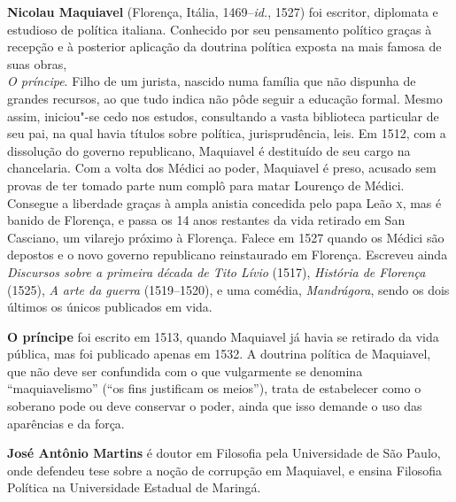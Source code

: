 \textbf{Nicolau Maquiavel} (Florença, Itália, 1469--\textit{id.}, 1527) foi escritor, diplomata e estudioso de política italiana. Conhecido por seu pensamento político graças à recepção e à posterior aplicação da doutrina política exposta na mais famosa de suas obras,\\ \textit{O príncipe}. Filho de um jurista, nascido numa família que não dispunha de grandes recursos, ao que tudo indica não pôde seguir a educação formal. Mesmo assim, iniciou"-se cedo nos estudos, consultando a vasta biblioteca particular de seu pai, na qual havia títulos sobre política, jurisprudência, leis. Em 1512, com a dissolução do governo republicano, Maquiavel é destituído de seu cargo na chancelaria. Com a volta dos Médici ao poder, Maquiavel é preso, acusado sem provas de ter tomado parte num complô para matar Lourenço de Médici. Consegue a liberdade graças à ampla anistia concedida pelo papa Leão \textsc{x}, mas é banido de Florença, e passa os 14 anos restantes da vida retirado em San Casciano, um vilarejo próximo à Florença. Falece em 1527 quando os Médici são depostos e o novo governo republicano reinstaurado em Florença. Escreveu ainda \textit{Discursos sobre a primeira década de Tito Lívio} (1517), \textit{História de Florença} (1525), \textit{A arte da guerra} (1519--1520), e uma comédia, \textit{Mandrágora}, sendo os dois últimos os únicos publicados em vida. 

\textbf{O príncipe} foi escrito em 1513, quando Maquiavel já havia se retirado da vida pública, mas foi publicado apenas em 1532. A doutrina política de Maquiavel, que não deve ser confundida com o que vulgarmente se denomina “maquiavelismo” (“os fins justificam os meios”), trata de estabelecer como o soberano pode ou deve conservar o poder, ainda que isso demande o uso das aparências e da força. 

\textbf{José Antônio Martins} é doutor em Filosofia pela Universidade de São Paulo, onde defendeu tese sobre a noção de corrupção em Maquiavel, e ensina Filosofia Política na Universidade Estadual de Maringá.


